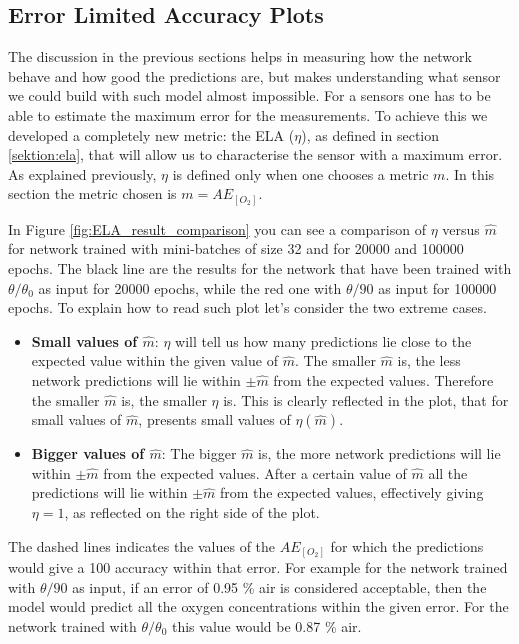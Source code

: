 \documentclass[9pt,twocolumn,twoside,pdftex]{optica}
\begin{document}
\subsection{Error Limited Accuracy Plots}

The discussion in the previous sections helps in measuring how the network behave and how good the predictions are, but makes understanding what sensor we could build with such model almost impossible. For a sensors one has to be able to estimate the maximum error for the measurements. To achieve this we developed a completely new metric: the ELA ($\eta$), as defined in section \ref{sektion:ela}, that will allow us to characterise the sensor with a maximum error. As explained previously, $\eta$ is defined only when one chooses a metric $m$. In this section the metric chosen is $m=AE_{[O_2]}$.  

In Figure \ref{fig:ELA_result_comparison} you can see a comparison of $\eta$ versus $\hat m$ for network trained with mini-batches of size 32 and for 20000 and 100000 epochs. The black line are the results for the network that have been trained with $\theta/\theta_0$ as input for 20000 epochs, while the red one with $\theta/90$ as input for 100000 epochs.  
To explain how to read such plot let's consider the two extreme cases. 
\begin{itemize}
\item {\bf Small values of $\hat m$}: $\eta$ will tell us how many predictions lie close to the expected value within the given value of $\hat m$. The smaller $\hat m$ is, the less network predictions will lie within $\pm \hat m$ from the expected values. Therefore the smaller $\hat m$ is, the smaller $\eta$ is. This is clearly reflected in the plot, that for small values of $\hat m$, presents small values of $\eta(\hat m)$.
\item {\bf Bigger values of $\hat m$}: The bigger $\hat m$ is, the more network predictions will lie within $\pm \hat m$ from the expected values. After a certain value of $\hat m$ all the predictions will lie within $\pm \hat m$ from the expected values, effectively giving $\eta = 1$, as reflected on the right side of the plot. 
\end{itemize}

The dashed lines indicates the values of the $AE_{[O_2]}$ for which the predictions would give a 100 accuracy within that error. For example for the network trained with $\theta/90$ as input, if an error of 0.95 \% air is considered acceptable, then the model would predict all the oxygen concentrations within the given error. For the network trained with $\theta/\theta_0$ this value would be 0.87 \% air. 
\end{document}
